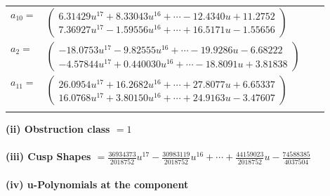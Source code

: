 \documentclass[1p]{elsarticle_modified}
\theoremstyle{definition}
\begin{document}
\begin{tabular}{m{7pt} m{180pt} m{7pt} m{180pt} }
\flushright $a_{10}=$&$\begin{pmatrix}6.31429 u^{17}+8.33043 u^{16}+\cdots-12.4340 u+11.2752\\7.36927 u^{17}-1.59556 u^{16}+\cdots+16.5171 u-1.55656\end{pmatrix}$ \\
\flushright $a_{2}=$&$\begin{pmatrix}-18.0753 u^{17}-9.82555 u^{16}+\cdots-19.9286 u-6.68222\\-4.57844 u^{17}+0.440030 u^{16}+\cdots-18.8091 u+3.81838\end{pmatrix}$ \\
\flushright $a_{11}=$&$\begin{pmatrix}26.0954 u^{17}+16.2682 u^{16}+\cdots+27.8077 u+6.65337\\16.0768 u^{17}+3.80150 u^{16}+\cdots+24.9163 u-3.47607\end{pmatrix}$\\&\end{tabular}
\flushleft \textbf{(ii) Obstruction class $= 1$}\\~\\
\flushleft \textbf{(iii) Cusp Shapes $= \frac{36934373}{2018752} u^{17}-\frac{30983119}{2018752} u^{16}+\cdots+\frac{44159023}{2018752} u-\frac{74588385}{4037504}$}\\~\\
\newpage\renewcommand{\arraystretch}{1}
\flushleft \textbf{(iv) u-Polynomials at the component}\newline \\
\end{document}
